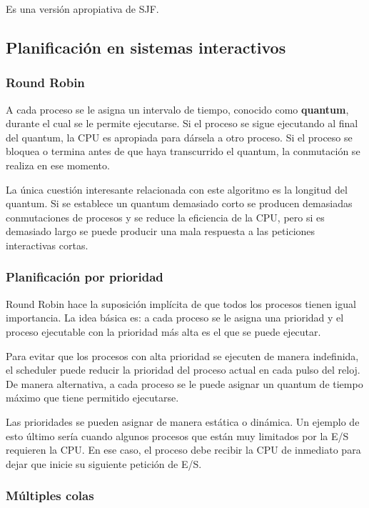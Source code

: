 Es una versión apropiativa de SJF.


\subsection{Planificación en sistemas interactivos}

\subsubsection{Round Robin}

A cada proceso se le asigna un intervalo de tiempo, conocido como \textbf{quantum}, durante el cual se le permite ejecutarse. Si el proceso se sigue ejecutando al final del quantum, la CPU es apropiada para dársela a otro proceso. Si el proceso se bloquea o termina antes de que haya transcurrido el quantum, la conmutación se realiza en ese momento.

La única cuestión interesante relacionada con este algoritmo es la longitud del quantum. Si se establece un quantum demasiado corto se producen demasiadas conmutaciones de procesos y se reduce la eficiencia de la CPU, pero si es demasiado largo se puede producir una mala respuesta a las peticiones interactivas cortas.

\subsubsection{Planificación por prioridad}

Round Robin hace la suposición implícita de que todos los procesos tienen igual importancia. La idea básica es: a cada proceso se le asigna una prioridad y el proceso ejecutable con la prioridad más alta es el que se puede ejecutar.

Para evitar que los procesos con alta prioridad se ejecuten de manera indefinida, el scheduler puede reducir la prioridad del proceso actual en cada pulso del reloj. De manera alternativa, a cada proceso se le puede asignar un quantum de tiempo máximo que tiene permitido ejecutarse.

Las prioridades se pueden asignar de manera estática o dinámica. Un ejemplo de esto último sería cuando algunos procesos que están muy limitados por la E/S requieren la CPU. En ese caso, el proceso debe recibir la CPU de inmediato para dejar que inicie su siguiente petición de E/S.

\subsubsection{Múltiples colas}

